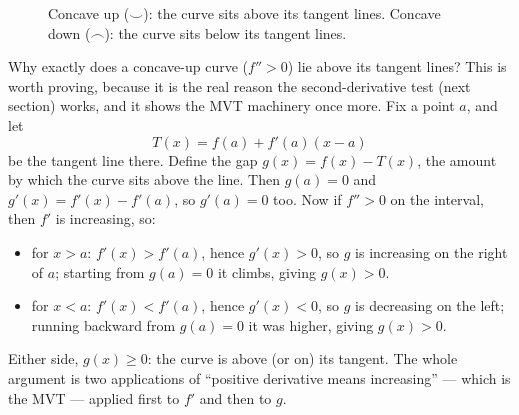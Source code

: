 \begin{figure}[H]
\centering
{}
\caption{Concave up ($\smile$): the curve sits above its tangent lines. Concave
down ($\frown$): the curve sits below its tangent lines.}
\label{ch16:fig-concavity}
\end{figure}

\begin{whybox}
Why exactly does a concave-up curve ($f''>0$) lie above its tangent lines? This is
worth proving, because it is the real reason the second-derivative test (next
section) works, and it shows the MVT machinery once more. Fix a point $a$, and let
\[
T(x)=f(a)+f'(a)(x-a)
\]
be the tangent line there. Define the gap $g(x)=f(x)-T(x)$, the amount by which the
curve sits above the line. Then $g(a)=0$ and $g'(x)=f'(x)-f'(a)$, so $g'(a)=0$ too.
Now if $f''>0$ on the interval, then $f'$ is increasing, so:
\begin{itemize}
\item for $x>a$: $f'(x)>f'(a)$, hence $g'(x)>0$, so $g$ is increasing on the right
of $a$; starting from $g(a)=0$ it climbs, giving $g(x)>0$.
\item for $x<a$: $f'(x)<f'(a)$, hence $g'(x)<0$, so $g$ is decreasing on the left;
running backward from $g(a)=0$ it was higher, giving $g(x)>0$.
\end{itemize}
Either side, $g(x)\ge 0$: the curve is above (or on) its tangent. The whole
argument is two applications of ``positive derivative means increasing'' --- which
is the MVT --- applied first to $f'$ and then to $g$.
\end{whybox}

